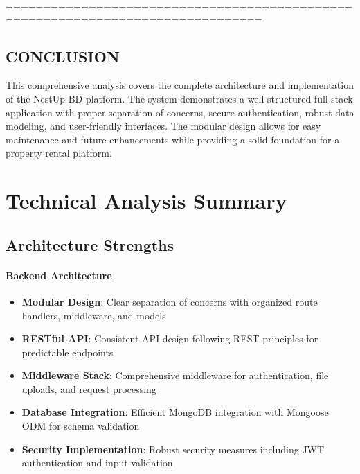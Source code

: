 \documentclass[12pt,a4paper]{article}
\begin{document}
================================================================================

\hypertarget{conclusion}{%
\subsection{CONCLUSION}\label{conclusion}}

This comprehensive analysis covers the complete architecture and
implementation of the NestUp BD platform. The system demonstrates a
well-structured full-stack application with proper separation of
concerns, secure authentication, robust data modeling, and user-friendly
interfaces. The modular design allows for easy maintenance and future
enhancements while providing a solid foundation for a property rental
platform.

\section{Technical Analysis Summary}
\label{sec:technical-summary}

\subsection{Architecture Strengths}
\label{subsec:architecture-strengths}

\paragraph{Backend Architecture}
\begin{itemize}
\item \textbf{Modular Design}: Clear separation of concerns with organized route handlers, middleware, and models
\item \textbf{RESTful API}: Consistent API design following REST principles for predictable endpoints
\item \textbf{Middleware Stack}: Comprehensive middleware for authentication, file uploads, and request processing
\item \textbf{Database Integration}: Efficient MongoDB integration with Mongoose ODM for schema validation
\item \textbf{Security Implementation}: Robust security measures including JWT authentication and input validation
\end{itemize}
\end{document}
